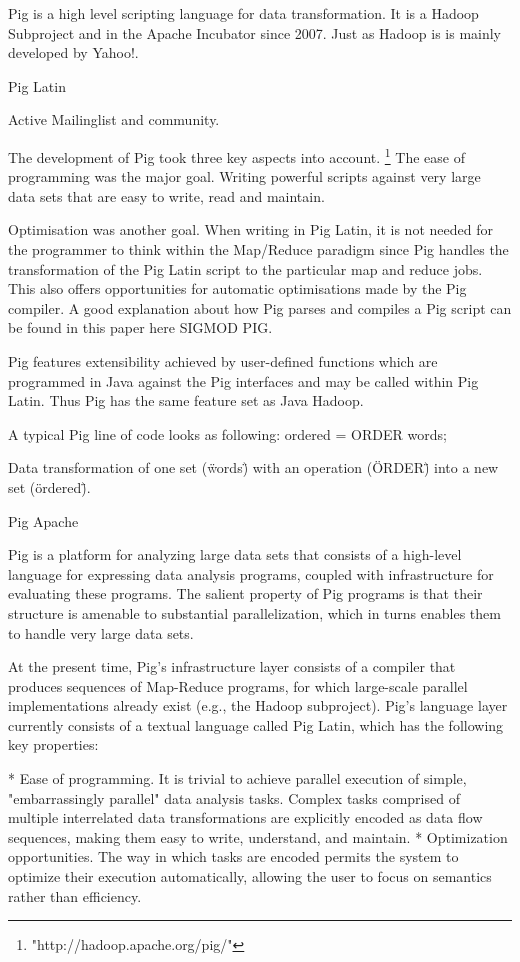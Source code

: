 Pig is a high level scripting language for data transformation. It is a Hadoop Subproject and in the Apache Incubator since 2007. Just as Hadoop is is mainly developed by Yahoo!. 

Pig Latin

Active Mailinglist and community.

The development of Pig took three key aspects into account. \footnote{"http://hadoop.apache.org/pig/"} The ease of programming was the major goal. Writing powerful scripts against very large data sets that are easy to write, read and maintain.

Optimisation was another goal. When writing in Pig Latin, it is not needed for the programmer to think within the Map/Reduce paradigm since Pig handles the transformation of the Pig Latin script to the particular map and reduce jobs. This also offers opportunities for automatic optimisations made by the Pig compiler. A good explanation about how Pig parses and compiles a Pig script can be found in this paper here SIGMOD PIG.    

Pig features extensibility achieved by user-defined functions which are programmed in Java against the Pig interfaces and may be called within Pig Latin. Thus Pig has the same feature set as Java Hadoop.

A typical Pig line of code looks as following:
ordered = ORDER words;

Data transformation of one set (\"words\") with an operation (\"ORDER\") into a new set (\"ordered\"). 


                           


Pig Apache

                                                    Pig is a platform for analyzing large data sets that consists of a high-level language for expressing data analysis programs, coupled with infrastructure for evaluating these programs. The salient property of Pig programs is that their structure is amenable to substantial parallelization, which in turns enables them to handle very large data sets.

At the present time, Pig's infrastructure layer consists of a compiler that produces sequences of Map-Reduce programs, for which large-scale parallel implementations already exist (e.g., the Hadoop subproject). Pig's language layer currently consists of a textual language called Pig Latin, which has the following key properties:

    * Ease of programming. It is trivial to achieve parallel execution of simple, "embarrassingly parallel" data analysis tasks. Complex tasks comprised of multiple interrelated data transformations are explicitly encoded as data flow sequences, making them easy to write, understand, and maintain.
    * Optimization opportunities. The way in which tasks are encoded permits the system to optimize their execution automatically, allowing the user to focus on semantics rather than efficiency.
